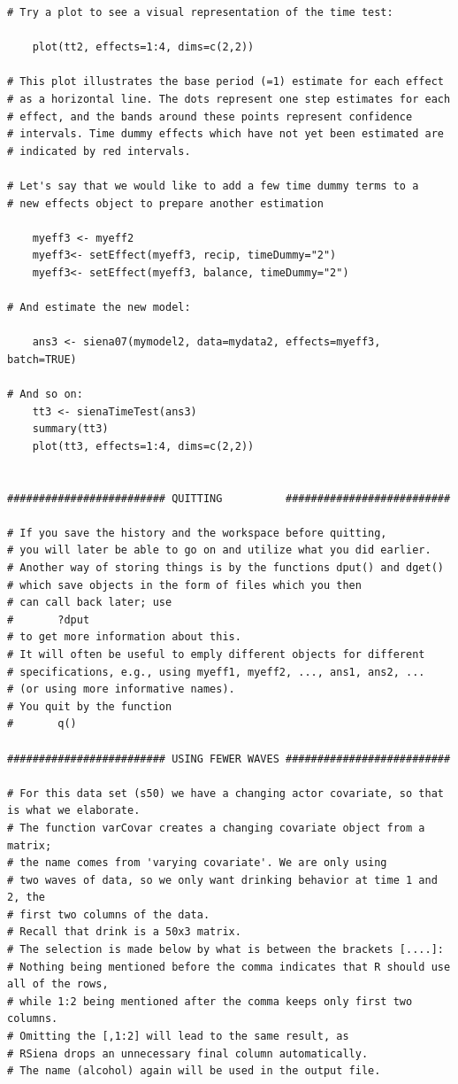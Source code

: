 \documentclass[a4paper,fleqn]{article}
\newcommand{\+}{\, + \,}
\begin{document}
{\begin{verbatim}
# Try a plot to see a visual representation of the time test:
 
    plot(tt2, effects=1:4, dims=c(2,2))

# This plot illustrates the base period (=1) estimate for each effect
# as a horizontal line. The dots represent one step estimates for each
# effect, and the bands around these points represent confidence
# intervals. Time dummy effects which have not yet been estimated are
# indicated by red intervals.
 
# Let's say that we would like to add a few time dummy terms to a
# new effects object to prepare another estimation
 
    myeff3 <- myeff2
    myeff3<- setEffect(myeff3, recip, timeDummy="2")
    myeff3<- setEffect(myeff3, balance, timeDummy="2")
 
# And estimate the new model:
 
    ans3 <- siena07(mymodel2, data=mydata2, effects=myeff3, batch=TRUE)

# And so on:
    tt3 <- sienaTimeTest(ans3)
    summary(tt3)
    plot(tt3, effects=1:4, dims=c(2,2))


######################### QUITTING          ##########################

# If you save the history and the workspace before quitting,
# you will later be able to go on and utilize what you did earlier.
# Another way of storing things is by the functions dput() and dget()
# which save objects in the form of files which you then
# can call back later; use
#       ?dput
# to get more information about this.
# It will often be useful to emply different objects for different
# specifications, e.g., using myeff1, myeff2, ..., ans1, ans2, ...
# (or using more informative names).
# You quit by the function
#       q()

######################### USING FEWER WAVES ##########################

# For this data set (s50) we have a changing actor covariate, so that is what we elaborate.
# The function varCovar creates a changing covariate object from a matrix;
# the name comes from 'varying covariate'. We are only using
# two waves of data, so we only want drinking behavior at time 1 and 2, the
# first two columns of the data.
# Recall that drink is a 50x3 matrix.
# The selection is made below by what is between the brackets [....]:
# Nothing being mentioned before the comma indicates that R should use all of the rows,
# while 1:2 being mentioned after the comma keeps only first two columns.
# Omitting the [,1:2] will lead to the same result, as
# RSiena drops an unnecessary final column automatically.
# The name (alcohol) again will be used in the output file.


\end{verbatim}}
\end{document}

